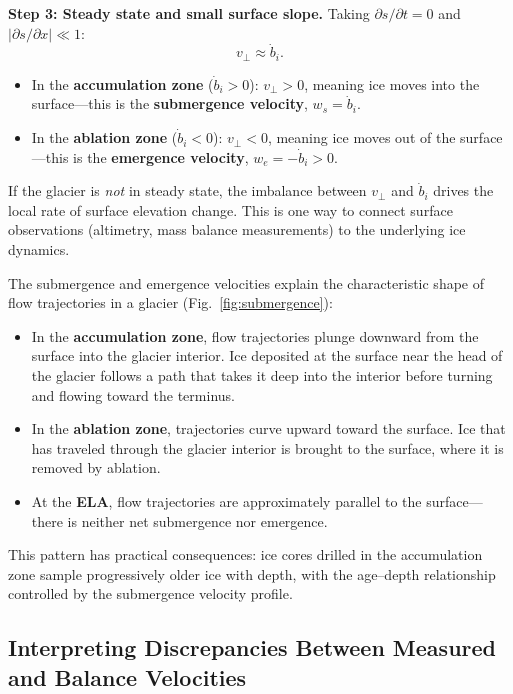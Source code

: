 \documentclass[11pt]{article}
\begin{document}
\begin{tcolorbox}[
  colback=orange!25,
  colframe=orange!70!black,
  title={\textbf{Derivation: Submergence and Emergence Velocities from the Kinematic Boundary Condition}},
  fonttitle=\bfseries,
  breakable
]
\medskip
\noindent\textbf{Step 3: Steady state and small surface slope.}  Taking $\partial s/\partial t = 0$ and $|\partial s/\partial x| \ll 1$:
\begin{equation}
  \boxed{v_\perp \approx \dot{b}_i.}
\end{equation}

\begin{itemize}
  \item In the \textbf{accumulation zone} ($\dot{b}_i > 0$): $v_\perp > 0$, meaning ice moves into the surface---this is the \textbf{submergence velocity}, $w_s = \dot{b}_i$.
  \item In the \textbf{ablation zone} ($\dot{b}_i < 0$): $v_\perp < 0$, meaning ice moves out of the surface---this is the \textbf{emergence velocity}, $w_e = -\dot{b}_i > 0$.
\end{itemize}

If the glacier is \emph{not} in steady state, the imbalance between $v_\perp$ and $\dot{b}_i$ drives the local rate of surface elevation change.  This is one way to connect surface observations (altimetry, mass balance measurements) to the underlying ice dynamics.
\end{tcolorbox}

The submergence and emergence velocities explain the characteristic shape of flow trajectories in a glacier (Fig.~\ref{fig:submergence}):
\begin{itemize}
  \item In the \textbf{accumulation zone}, flow trajectories plunge downward from the surface into the glacier interior.  Ice deposited at the surface near the head of the glacier follows a path that takes it deep into the interior before turning and flowing toward the terminus.
  \item In the \textbf{ablation zone}, trajectories curve upward toward the surface.  Ice that has traveled through the glacier interior is brought to the surface, where it is removed by ablation.
  \item At the \textbf{ELA}, flow trajectories are approximately parallel to the surface---there is neither net submergence nor emergence.
\end{itemize}

This pattern has practical consequences: ice cores drilled in the accumulation zone sample progressively older ice with depth, with the age--depth relationship controlled by the submergence velocity profile.

\subsection{Interpreting Discrepancies Between Measured and Balance Velocities}
\end{document}
